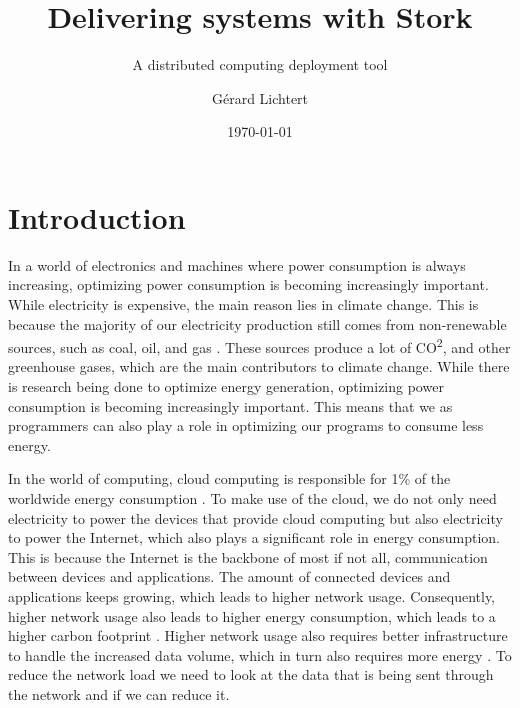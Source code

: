 \documentclass[a4paper]{article}
\title{Delivering systems with Stork}
\subtitle{ A distributed computing deployment tool}
\author{Gérard Lichtert}
\date{\today}
\begin{document}
\maketitle
\tableofcontents
\newpage
\raggedright{}


\section{Introduction}
In a world of electronics and machines where power consumption is always increasing, optimizing power consumption is becoming increasingly important. While electricity is expensive, the main reason lies in climate change. This is because the majority of our electricity production still comes from non-renewable sources, such as coal, oil, and gas \cite{owid-energy-mix}. These sources produce a lot of CO\textsuperscript{2}, and other greenhouse gases, which are the main contributors to climate change. While there is research being done to optimize energy generation, optimizing power consumption is becoming increasingly important. This means that we as programmers can also play a role in optimizing our programs to consume less energy.

In the world of computing, cloud computing is responsible for 1\% of the worldwide energy consumption \cite{cloudcomputingenergycrisis}. To make use of the cloud, we do not only need electricity to power the devices that provide cloud computing but also electricity to power the Internet, which also plays a significant role in energy consumption. This is because the Internet is the backbone of most if not all, communication between devices and applications. The amount of connected devices and applications keeps growing, which leads to higher network usage. Consequently, higher network usage also leads to higher energy consumption, which leads to a higher carbon footprint \cite{RATHEESH}. Higher network usage also requires better infrastructure to handle the increased data volume, which in turn also requires more energy \cite{datavolumeeffects}. To reduce the network load we need to look at the data that is being sent through the network and if we can reduce it.
\end{document}
